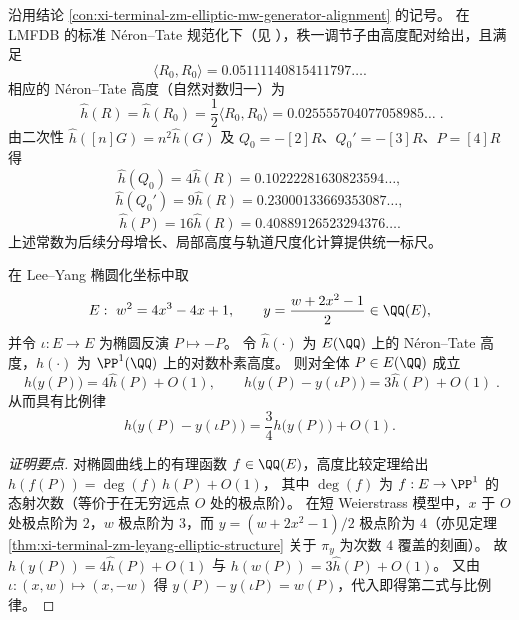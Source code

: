 \begin{conclusion}\label{con:xi-terminal-zm-elliptic-nt-height-scaling}
沿用结论 \ref{con:xi-terminal-zm-elliptic-mw-generator-alignment} 的记号。
在 LMFDB 的标准 N\'eron--Tate 规范化下（见 \cite{LMFDBEllipticCurve37a1}），秩一调节子由高度配对给出，且满足
\[
\langle R_0,R_0\rangle=0.05111140815411797\ldots.
\]
相应的 N\'eron--Tate 高度（自然对数归一）为
\[
\boxed{\;
\hat h(R)=\hat h(R_0)=\frac12\langle R_0,R_0\rangle
=0.025555704077058985\ldots\;} .
\]
由二次性 \(\hat h([n]G)=n^2\hat h(G)\) 及 \(Q_0=-[2]R\)、\(Q_0'=-[3]R\)、\(P=[4]R\) 得
\[
\hat h(Q_0)=4\hat h(R)=0.10222281630823594\ldots,
\]
\[
\hat h(Q_0')=9\hat h(R)=0.23000133669353087\ldots,
\]
\[
\hat h(P)=16\hat h(R)=0.40889126523294376\ldots.
\]
上述常数为后续分母增长、局部高度与轨道尺度化计算提供统一标尺。
\end{conclusion}

\begin{conclusion}\label{con:xi-terminal-zm-elliptic-height-tunneling-degree-rigidity}
在 Lee--Yang 椭圆化坐标中取
\[
E:\ w^{2}=4x^{3}-4x+1,
\qquad
y=\frac{w+2x^{2}-1}{2}\in\QQ(E),
\]
并令 \(\iota:E\to E\) 为椭圆反演 \(P\mapsto -P\)。
令 \(\hat h(\cdot)\) 为 \(E(\QQ)\) 上的 N\'eron--Tate 高度，\(h(\cdot)\) 为 \(\PP^{1}(\QQ)\) 上的对数朴素高度。
则对全体 \(P\in E(\QQ)\) 成立
\[
\boxed{\;
h\bigl(y(P)\bigr)=4\hat h(P)+O(1),
\qquad
h\bigl(y(P)-y(\iota P)\bigr)=3\hat h(P)+O(1)\; }.
\]
从而具有比例律
\[
h\bigl(y(P)-y(\iota P)\bigr)=\frac{3}{4}h\bigl(y(P)\bigr)+O(1).
\]
\end{conclusion}
\begin{proof}[证明要点]
对椭圆曲线上的有理函数 \(f\in\QQ(E)\)，高度比较定理给出
\(
h(f(P))=\deg(f)\,\hat h(P)+O(1)
\)，
其中 \(\deg(f)\) 为 \(f:E\to\PP^1\) 的态射次数（等价于在无穷远点 \(O\) 处的极点阶）。
在短 Weierstrass 模型中，\(x\) 于 \(O\) 处极点阶为 \(2\)，\(w\) 极点阶为 \(3\)，而 \(y=(w+2x^2-1)/2\) 极点阶为 \(4\)（亦见定理 \ref{thm:xi-terminal-zm-leyang-elliptic-structure} 关于 \(\pi_y\) 为次数 \(4\) 覆盖的刻画）。
故 \(h(y(P))=4\hat h(P)+O(1)\) 与 \(h(w(P))=3\hat h(P)+O(1)\)。
又由 \(\iota:(x,w)\mapsto(x,-w)\) 得 \(y(P)-y(\iota P)=w(P)\)，代入即得第二式与比例律。
\end{proof}

